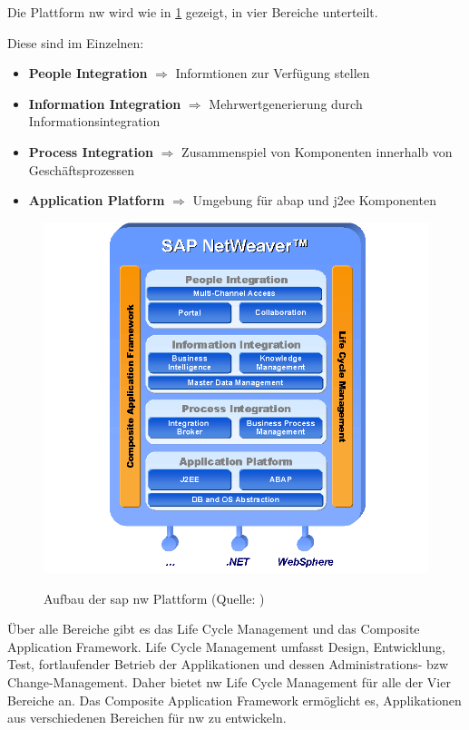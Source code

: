 Die Plattform \gls{nw} wird wie in \ref{abb:SAPNWGrundlagen} gezeigt, in vier Bereiche unterteilt.

Diese sind im Einzelnen:
\begin{itemize}
	\item \textbf{People Integration} $\Rightarrow$ Informtionen zur Verfügung stellen
	\item \textbf{Information Integration} $\Rightarrow$ Mehrwertgenerierung durch Informationsintegration
	\item \textbf{Process Integration} $\Rightarrow$ Zusammenspiel von Komponenten innerhalb von Geschäftsprozessen
	\item \textbf{Application Platform} $\Rightarrow$ Umgebung für \gls{abap} und \gls{j2ee} Komponenten
\end{itemize}

\begin{figure}[H]
	\begin{center}
	\includegraphics[width=1\linewidth]{grafiken/NetWeaver.png}
	\vspace{-20pt}
	\caption{Aufbau der \gls{sap} \gls{nw} Plattform (Quelle: \cite{NWGrundlagen})}
	\vspace{-10pt}
	\label{abb:SAPNWGrundlagen}
	\end{center}
\end{figure}

Über alle Bereiche gibt es das Life Cycle Management und das Composite Application Framework. Life Cycle Management umfasst Design, Entwicklung, Test, fortlaufender Betrieb der Applikationen und dessen Administrations- \gls{bzw} Change-Management. Daher bietet \gls{nw} Life Cycle Management für alle der Vier Bereiche an.
Das Composite Application Framework ermöglicht es, Applikationen aus verschiedenen Bereichen für \gls{nw} zu entwickeln.

